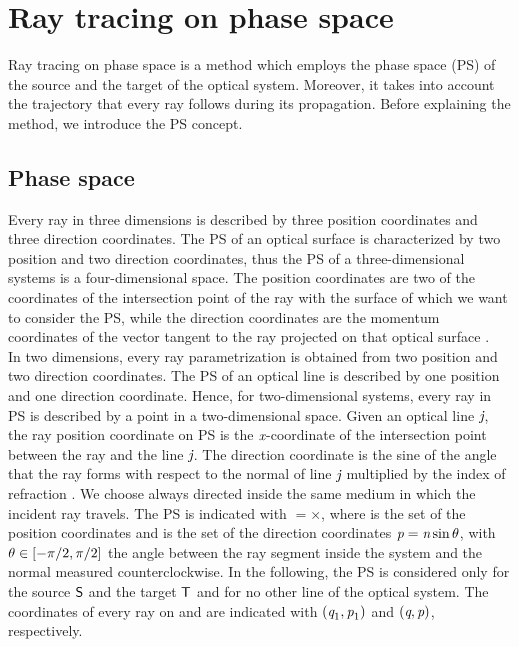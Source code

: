\chapter{Ray tracing on phase space} \label{chap:PS}
Ray tracing on phase space is a method which employs the phase space (PS) of the source and the target of the optical system.
Moreover, it takes into account the trajectory that every ray follows during its propagation.
Before explaining the method, we introduce the PS concept.
\section{Phase space}\label{sec:PSconcept}
Every ray in three dimensions is described by three position coordinates and three direction coordinates. 
The PS of an optical surface is characterized by two position and two direction coordinates, thus the PS of a three-dimensional systems is a four-dimensional space. The position coordinates are two of the coordinates of the intersection point of the ray with the surface of which we want to consider the PS, while the direction coordinates are the momentum coordinates of the vector tangent to the ray projected on that optical surface \cite{wolf2004geometric}.
\\ \indent 
In two dimensions, every ray parametrization is obtained from two position and two direction coordinates. The PS of an optical line is described by one position and one direction coordinate. Hence, for two-dimensional systems, every ray in PS is described by a point in a two-dimensional space.
Given an optical line $\textit{j}$, the ray position coordinate on PS is the $\textit{x}$-coordinate of the intersection point between the ray and the line $\textit{j}$. The direction coordinate is the sine of the angle that the ray forms with respect to the normal \vect{$\boldsymbol{\nu}$} of line $\textit{j}$ multiplied by the index of refraction \n. We choose \vect{$\boldsymbol{\nu}$} always directed inside the same medium in which the incident ray travels. The PS is indicated with $=$$\times$,
where  is the set of the position coordinates  and  is the set of the direction coordinates $\textit{p}=\textit{n}\sin{\theta}$, with $\theta\in[-\pi/2, \pi/2]$ the angle between the ray segment inside the system and the normal measured counterclockwise.
In the following, the PS is considered only for the source $\textsf{S}$ and the target $\textsf{T}$ and for no other line of the optical system.
The coordinates of every ray on  and  are indicated with $(\textit{q}_1,\textit{p}_1)$ and $(\textit{q},\textit{p})$, respectively.\\ \indent
